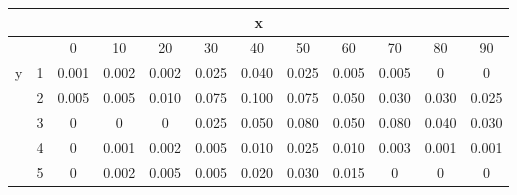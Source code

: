 \documentclass[12pt]{report}
\begin{document}
  \newpage
  \begin{table}[h!]
    \centering
    \begin{tabular}{|cccccccccccc|}
    \hline
    \multicolumn{12}{|c|}{x}                                                                                                                                                                                                                                                                                                                       \\ \hline
    \multicolumn{2}{|c|}{}                                            & \multicolumn{1}{c|}{0}     & \multicolumn{1}{c|}{10}    & \multicolumn{1}{c|}{20}    & \multicolumn{1}{c|}{30}    & \multicolumn{1}{c|}{40}    & \multicolumn{1}{c|}{50}    & \multicolumn{1}{c|}{60}    & \multicolumn{1}{c|}{70}    & \multicolumn{1}{c|}{80}    & 90    \\ \hline
    \multicolumn{1}{|c|}{\multirow{5}{*}{y}} & \multicolumn{1}{c|}{1} & \multicolumn{1}{c|}{0.001} & \multicolumn{1}{c|}{0.002} & \multicolumn{1}{c|}{0.002} & \multicolumn{1}{c|}{0.025} & \multicolumn{1}{c|}{0.040} & \multicolumn{1}{c|}{0.025} & \multicolumn{1}{c|}{0.005} & \multicolumn{1}{c|}{0.005} & \multicolumn{1}{c|}{0}     & 0     \\ \cline{2-12} 
    \multicolumn{1}{|c|}{}                   & \multicolumn{1}{c|}{2} & \multicolumn{1}{c|}{0.005} & \multicolumn{1}{c|}{0.005} & \multicolumn{1}{c|}{0.010} & \multicolumn{1}{c|}{0.075} & \multicolumn{1}{c|}{0.100} & \multicolumn{1}{c|}{0.075} & \multicolumn{1}{c|}{0.050} & \multicolumn{1}{c|}{0.030} & \multicolumn{1}{c|}{0.030} & 0.025 \\ \cline{2-12} 
    \multicolumn{1}{|c|}{}                   & \multicolumn{1}{c|}{3} & \multicolumn{1}{c|}{0}     & \multicolumn{1}{c|}{0}     & \multicolumn{1}{c|}{0}     & \multicolumn{1}{c|}{0.025} & \multicolumn{1}{c|}{0.050} & \multicolumn{1}{c|}{0.080} & \multicolumn{1}{c|}{0.050} & \multicolumn{1}{c|}{0.080} & \multicolumn{1}{c|}{0.040} & 0.030 \\ \cline{2-12} 
    \multicolumn{1}{|c|}{}                   & \multicolumn{1}{c|}{4} & \multicolumn{1}{c|}{0}     & \multicolumn{1}{c|}{0.001} & \multicolumn{1}{c|}{0.002} & \multicolumn{1}{c|}{0.005} & \multicolumn{1}{c|}{0.010} & \multicolumn{1}{c|}{0.025} & \multicolumn{1}{c|}{0.010} & \multicolumn{1}{c|}{0.003} & \multicolumn{1}{c|}{0.001} & 0.001 \\ \cline{2-12} 
    \multicolumn{1}{|c|}{}                   & \multicolumn{1}{c|}{5} & \multicolumn{1}{c|}{0}     & \multicolumn{1}{c|}{0.002} & \multicolumn{1}{c|}{0.005} & \multicolumn{1}{c|}{0.005} & \multicolumn{1}{c|}{0.020} & \multicolumn{1}{c|}{0.030} & \multicolumn{1}{c|}{0.015} & \multicolumn{1}{c|}{0}     & \multicolumn{1}{c|}{0}     & 0     \\ \hline
    \end{tabular}
  \end{table}
\end{document}
